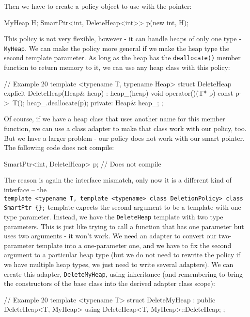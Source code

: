 Then we have to create a policy object to use with the pointer:

\begin{code}
MyHeap H;
SmartPtr<int, DeleteHeap<int>> p(new int, H);
\end{code}

This policy is not very flexible, however - it can handle heaps of only one type - \texttt{MyHeap}. We can make the policy more general if we make the heap type the second template parameter. As long as the heap has the \texttt{deallocate()} member function to return memory to it, we can use any heap class with this policy:

\begin{code}
// Example 20
template <typename T, typename Heap> struct DeleteHeap {
  explicit DeleteHeap(Heap& heap) : heap_(heap) {}
  void operator()(T* p) const {
    p->~T();
    heap_.deallocate(p);
  }
  private:
  Heap& heap_;
};
\end{code}

Of course, if we have a heap class that uses another name for this member function, we can use a class adapter to make that class work with our policy, too. But we have a larger problem - our policy does not work with our smart pointer. The following code does not compile:

\begin{code}
SmartPtr<int, DeletelHeap> p; // Does not compile
\end{code}

The reason is again the interface mismatch, only now it is a different kind of interface -- the \texttt{template\ \textless{}typename\ T,\ template\ \textless{}typename\textgreater{}\ class\ DeletionPolicy\textgreater{}\ class\ SmartPtr\ \{\};} template expects the second argument to be a template with one type parameter. Instead, we have the \texttt{DeleteHeap} template with two type parameters. This is just like trying to call a function that has one parameter but uses two arguments - it won't work. We need an adapter to convert our two-parameter template into a one-parameter one, and we have to fix the second argument to a particular heap type (but we do not need to rewrite the policy if we have multiple heap types, we just need to write several adapters). We can create this adapter, \texttt{DeleteMyHeap}, using inheritance (and remembering to bring the constructors of the base class into the derived adapter class scope):

\begin{code}
// Example 20
template <typename T>
struct DeleteMyHeap : public DeleteHeap<T, MyHeap> {
  using DeleteHeap<T, MyHeap>::DeleteHeap;
};
\end{code}

